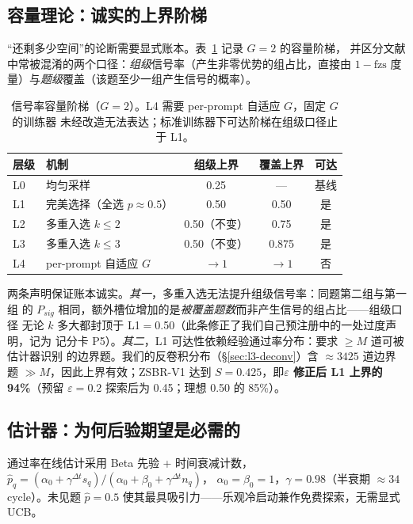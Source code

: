 \documentclass[11pt]{article}
\theoremstyle{definition}
\newcommand{\fzs}{\text{fzs}}
\begin{document}
\subsection{容量理论：诚实的上界阶梯}\label{sec:l2-cap}
“还剩多少空间”的论断需要显式账本。表~\ref{tab:staircase} 记录 $G{=}2$ 的容量阶梯，
并区分文献中常被混淆的两个口径：\emph{组级}信号率（产生非零优势的组占比，直接由
$1-\fzs$ 度量）与\emph{题级}覆盖（该题至少一组产生信号的概率）。

\begin{table}[t]
\centering\small
\caption{信号率容量阶梯（$G{=}2$）。L4 需要 per-prompt 自适应 $G$，固定 $G$ 的训练器
未经改造无法表达；标准训练器下可达阶梯在组级口径止于 L1。}
\label{tab:staircase}
\begin{tabular}{@{}llccc@{}}
\toprule
层级 & 机制 & 组级上界 & 覆盖上界 & 可达 \\
\midrule
L0 & 均匀采样 & 0.25 & --- & 基线 \\
L1 & 完美选择（全选 $p{\approx}0.5$） & 0.50 & 0.50 & 是 \\
L2 & 多重入选 $k{\le}2$ & 0.50（不变） & 0.75 & 是 \\
L3 & 多重入选 $k{\le}3$ & 0.50（不变） & 0.875 & 是 \\
L4 & per-prompt 自适应 $G$ & $\to1$ & $\to1$ & 否 \\
\bottomrule
\end{tabular}
\end{table}

两条声明保证账本诚实。\emph{其一}，多重入选无法提升组级信号率：同题第二组与第一组
的 $P_{sig}$ 相同，额外槽位增加的是\emph{被覆盖题数}而非产生信号的组占比——组级口径
无论 $k$ 多大都封顶于 L1$=$0.50（此条修正了我们自己预注册中的一处过度声明，记为
记分卡 P5）。\emph{其二}，L1 可达性依赖经验通过率分布：要求 $\ge M$ 道可被估计器识别
的边界题。我们的反卷积分布（\S\ref{sec:l3-deconv}）含 ${\approx}3425$ 道边界题
$\gg M$，因此上界有效；ZSBR-V1 达到 $S{=}0.425$，即\textbf{$\varepsilon$ 修正后 L1
上界的 94\%}（预留 $\varepsilon{=}0.2$ 探索后为 0.45；理想 0.50 的 85\%）。

\subsection{估计器：为何后验期望是必需的}\label{sec:l2-est}
通过率在线估计采用 Beta 先验 + 时间衰减计数，
$\hat p_q = (\alpha_0+\gamma^{\Delta t}s_q)/(\alpha_0+\beta_0+\gamma^{\Delta t}n_q)$，
$\alpha_0{=}\beta_0{=}1$，$\gamma{=}0.98$（半衰期 ${\approx}34$ cycle）。未见题
$\hat p{=}0.5$ 使其最具吸引力——乐观冷启动兼作免费探索，无需显式 UCB。
\end{document}
